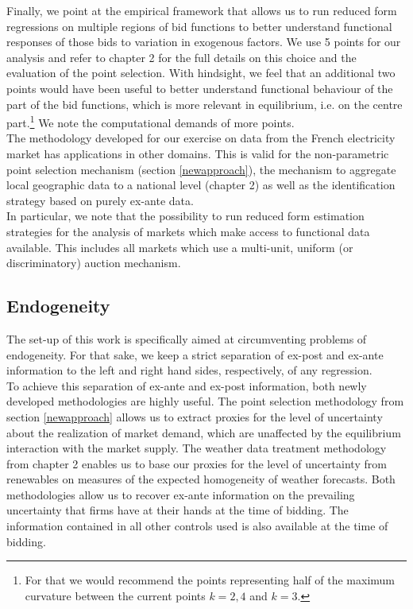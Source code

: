 Finally, we point at the empirical framework that allows us to run reduced form regressions on multiple regions of bid functions to better understand functional responses of those bids to variation in exogenous factors. We use 5 points for our analysis and refer to chapter 2 for the full details on this choice and the evaluation of the point selection. With hindsight, we feel that an additional two points would have been useful to better understand functional behaviour of the part of the bid functions, which is more relevant in equilibrium, i.e. on the centre part.\footnote{For that we would recommend the points representing half of the maximum curvature between the current points $k=2,4$ and $k=3$.} We note the computational demands of more points. \\

\label{externalvalidity}
The methodology developed for our exercise on data from the French electricity market has applications in other domains. This is valid for the non-parametric point selection mechanism (section \ref{newapproach}), the mechanism to aggregate local geographic data to a national level (chapter 2) as well as the identification strategy based on purely ex-ante data. \\

In particular, we note that the possibility to run reduced form estimation strategies for the analysis of markets which make access to functional data available. This includes all markets which use a multi-unit, uniform (or discriminatory) auction mechanism. \\

\subsection{Endogeneity}
\label{endogeneityconcern}
The set-up of this work is specifically aimed at circumventing problems of endogeneity. For that sake, we keep a strict separation of ex-post and ex-ante information to the left and right hand sides, respectively, of any regression. \\

To achieve this separation of ex-ante and ex-post information, both newly developed methodologies are highly useful. The point selection methodology from section \ref{newapproach} allows us to extract proxies for the level of uncertainty about the realization of market demand, which are unaffected by the equilibrium interaction with the market supply. The weather data treatment methodology from chapter 2 enables us to base our proxies for the level of uncertainty from renewables on measures of the expected homogeneity of weather forecasts. Both methodologies allow us to recover ex-ante information on the prevailing uncertainty that firms have at their hands at the time of bidding. The information contained in all other controls used is also available at the time of bidding. \\

